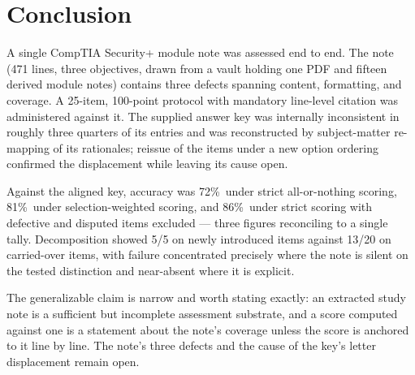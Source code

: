 \documentclass[11pt]{article}
\newcommand{\pct}{\%}
\begin{document}
\section{Conclusion}

A single CompTIA Security+ module note was assessed end to end. The note
(471 lines, three objectives, drawn from a vault holding one PDF and
fifteen derived module notes) contains three defects spanning content,
formatting, and coverage. A 25-item, 100-point protocol with mandatory
line-level citation was administered against it. The supplied answer key was
internally inconsistent in roughly three quarters of its entries and was
reconstructed by subject-matter re-mapping of its rationales; reissue of the
items under a new option ordering confirmed the displacement while leaving
its cause open.

Against the aligned key, accuracy was 72\pct\ under strict all-or-nothing
scoring, 81\pct\ under selection-weighted scoring, and 86\pct\ under strict
scoring with defective and disputed items excluded --- three figures
reconciling to a single tally. Decomposition showed 5/5 on newly introduced
items against 13/20 on carried-over items, with failure concentrated
precisely where the note is silent on the tested distinction and near-absent
where it is explicit.

The generalizable claim is narrow and worth stating exactly: an extracted
study note is a sufficient but incomplete assessment substrate, and a score
computed against one is a statement about the note's coverage unless the
score is anchored to it line by line. The note's three defects and the cause
of the key's letter displacement remain open.
\end{document}
